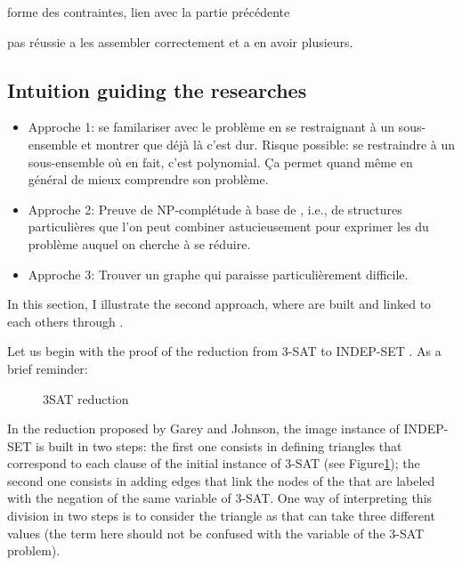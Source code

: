 forme des contraintes, lien avec la partie précédente

pas réussie a les assembler correctement et a en avoir plusieurs.

\subsection{Intuition guiding the researches}

\begin{itemize}
\item Approche 1: se familariser avec le problème en se restraignant à
  un sous-ensemble et montrer que déjà là c'est dur. Risque possible:
  se restraindre à un sous-ensemble où en fait, c'est polynomial. Ça
  permet quand même en général de mieux comprendre son problème.
\item Approche 2: Preuve de NP-complétude à base de \widget,
  i.e., de structures particulières que l'on peut combiner
  astucieusement pour exprimer les \constraint du problème
  auquel on cherche à se réduire.
\item Approche 3: Trouver un graphe qui paraisse particulièrement
  difficile.
\end{itemize}

In this section, I illustrate the second approach, where \widgets
are built and linked to each others through \constraints. 

Let us begin with the proof of the reduction from 3-SAT to INDEP-SET
\cite{polytech}. As a brief reminder:
\begin{definition}[3-SAT]
  
\end{definition}

\begin{definition}
  
\end{definition}
\begin{figure}

  \centering
  
  \caption{3SAT reduction}
  \label{fig:3sat}
\end{figure}

\noindent\hrulefill

In the reduction proposed by Garey and Johnson\cite{garey}, the image
instance of INDEP-SET is built in two steps: the first one consists in
defining triangles that correspond to each clause of the initial
instance of 3-SAT (see Figure\ref{fig:3sat}); the second one consists
in adding edges that link the nodes of the \widgets that are labeled
with the negation of the same variable of 3-SAT. One way of
interpreting this division in two steps is to consider the triangle
\widgets as \variables that can take three different values (the
\variable term here should not be confused with the variable of the
3-SAT problem). 

